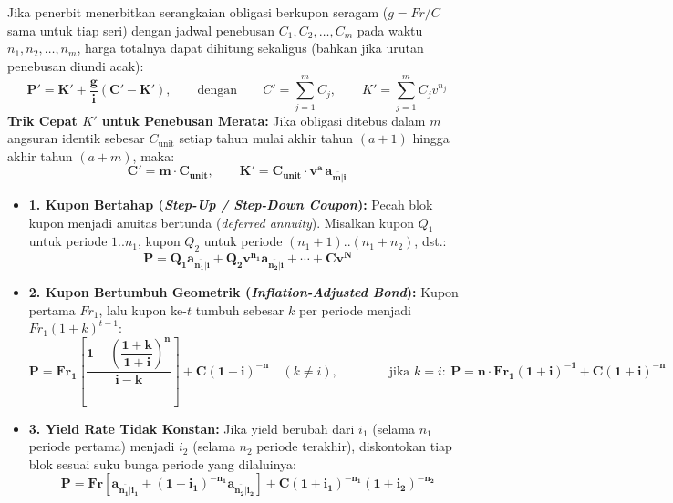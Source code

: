 \documentclass[10pt,a4paper]{article}
\newcommand{\angl}[1]{\overline{#1|}}
\begin{document}
\begin{teoremabox}
Jika penerbit menerbitkan serangkaian obligasi berkupon seragam ($g = Fr/C$ sama untuk tiap seri) dengan jadwal penebusan $C_1, C_2, \dots, C_m$ pada waktu $n_1, n_2, \dots, n_m$, harga totalnya dapat dihitung sekaligus (bahkan jika urutan penebusan diundi acak):
\[
    \mathbf{P' = K' + \frac{g}{i}\left(C' - K'\right)}, \qquad\text{dengan}\qquad C' = \sum_{j=1}^m C_j, \qquad K' = \sum_{j=1}^m C_j v^{n_j}
\]
\textbf{Trik Cepat $K'$ untuk Penebusan Merata:} Jika obligasi ditebus dalam $m$ angsuran identik sebesar $C_{\text{unit}}$ setiap tahun mulai akhir tahun $(a+1)$ hingga akhir tahun $(a+m)$, maka:
\[
    \mathbf{C' = m \cdot C_{\text{unit}}}, \qquad \mathbf{K' = C_{\text{unit}} \cdot v^a \, a_{\angl{m}i}}
\]
\end{teoremabox}

\begin{rumusbox}
\begin{itemize}[leftmargin=1.5em, topsep=1pt, itemsep=2pt]
    \item \textbf{1. Kupon Bertahap (\textit{Step-Up / Step-Down Coupon}):}
    Pecah blok kupon menjadi anuitas bertunda (\textit{deferred annuity}). Misalkan kupon $Q_1$ untuk periode $1..n_1$, kupon $Q_2$ untuk periode $(n_1+1)..(n_1+n_2)$, dst.:
    \[
        \mathbf{P = Q_1 a_{\angl{n_1}i} + Q_2 v^{n_1} a_{\angl{n_2}i} + \cdots + C v^N}
    \]
    \item \textbf{2. Kupon Bertumbuh Geometrik (\textit{Inflation-Adjusted Bond}):}
    Kupon pertama $Fr_1$, lalu kupon ke-$t$ tumbuh sebesar $k$ per periode menjadi $Fr_1(1+k)^{t-1}$:
    \[
        \mathbf{P = Fr_1 \left[\frac{1 - \left(\dfrac{1+k}{1+i}\right)^n}{i - k}\right] + C(1+i)^{-n}} \quad (k \neq i), \qquad\qquad \text{jika } k = i:\ \mathbf{P = n \cdot Fr_1(1+i)^{-1} + C(1+i)^{-n}}
    \]
    \item \textbf{3. Yield Rate Tidak Konstan:}
    Jika yield berubah dari $i_1$ (selama $n_1$ periode pertama) menjadi $i_2$ (selama $n_2$ periode terakhir), diskontokan tiap blok sesuai suku bunga periode yang dilaluinya:
    \[
        \mathbf{P = Fr \left[a_{\angl{n_1}i_1} + (1+i_1)^{-n_1} a_{\angl{n_2}i_2}\right] + C(1+i_1)^{-n_1}(1+i_2)^{-n_2}}
    \]
\end{itemize}
\end{rumusbox}

\end{document}
